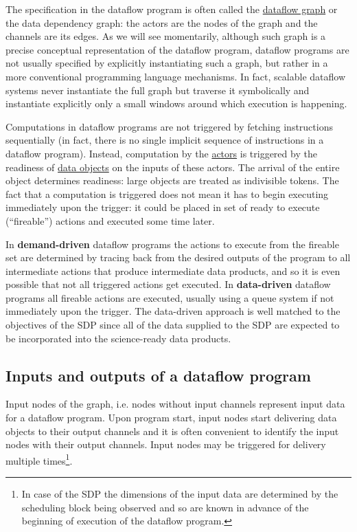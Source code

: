 \documentclass[11pt,a4paper]{article}
\begin{document}
The specification in the dataflow program is often called the
\underline{dataflow graph} or the data dependency graph: the actors
are the nodes of the graph and the channels are its edges. As we will
see momentarily, although such graph is a precise conceptual
representation of the dataflow program, dataflow programs are not
usually specified by explicitly instantiating such a graph, but rather
in a more conventional programming language mechanisms. In fact,
scalable dataflow
\citep{Bosilca6008964,Wozniak:2012:TDD:2443416.2443421} systems never
instantiate the full graph but traverse it symbolically and
instantiate explicitly only a small windows around which execution is
happening.

Computations in dataflow programs are not triggered by fetching
instructions sequentially (in fact, there is no single implicit
sequence of instructions in a dataflow program). Instead, computation
by the \underline{actors} is triggered by the readiness of
\underline{data objects} on the inputs of these actors. The arrival of
the entire object determines readiness: large objects are treated as
indivisible tokens.  The fact that a computation is triggered does not
mean it has to begin executing immediately upon the trigger: it could
be placed in set of ready to execute (“fireable”) actions and executed
some time later.

In {\bf demand-driven} dataflow programs the actions to execute from
the fireable set are determined by tracing back from the desired
outputs of the program to all intermediate actions that produce
intermediate data products, and so it is even possible that not all
triggered actions get executed. In {\bf data-driven} dataflow programs
all fireable actions are executed, usually using a queue system if not
immediately upon the trigger. The data-driven approach is well matched
to the objectives of the SDP since all of the data supplied to the SDP
are expected to be incorporated into the science-ready data products.


\subsection{Inputs and outputs of a dataflow program}

Input nodes of the graph, i.e. nodes without input channels represent
input data for a dataflow program.  Upon program start, input nodes
start delivering data objects to their output channels and it is often
convenient to identify the input nodes with their output
channels. Input nodes may be triggered for delivery multiple
times\footnote{In case of the SDP the dimensions of the input data are
  determined by the scheduling block being observed and so are known
  in advance of the beginning of execution of the dataflow program.}.
\end{document}
